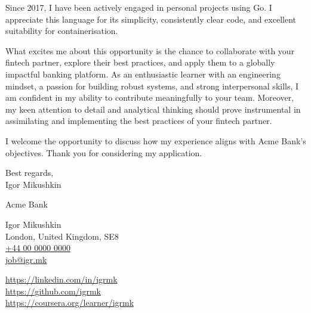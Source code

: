 \documentclass[9pt,a4paper]{juicv}
\makeatletter
\newcommand{\myphone}{\href{tel:+440000000000}{+44 00 0000 0000}}
\newcommand{\myemail}{\href{mailto:job@igr.mk}{job@igr.mk}}
\makeatother
\begin{document}
\begin{paracol}{2}
Since 2017, I have been actively engaged in personal projects using Go.
I appreciate this language for its simplicity, consistently clear code,
and excellent suitability for containerisation.

What excites me about this opportunity is the chance
to collaborate with your fintech partner, explore their best practices,
and apply them to a globally impactful banking platform.
As an enthusiastic learner with an engineering mindset,
a passion for building robust systems, and strong interpersonal skills,
I am confident in my ability to contribute meaningfully to your team.
Moreover, my keen attention to detail and analytical thinking should prove instrumental
in assimilating and implementing the best practices of your fintech partner.

I welcome the opportunity to discuss how my experience
aligns with Acme Bank's objectives.
Thank you for considering my application.

\vspace{12pt}

Best regards,\\
Igor Mikushkin

\newpage
\switchcolumn
\raggedright
\setlength{\parskip}{0em}

    Acme Bank

    Igor Mikushkin\\
    London, United Kingdom, SE8\\
    \myphone\\
    \myemail

    \vspace{6pt}
    {
        \small
        \href{https://linkedin.com/in/igrmk}{https://linkedin.com/in/igrmk}\\
        \href{https://github.com/igrmk}{https://github.com/igrmk}\\
        \href{https://coursera.org/learner/igrmk}{https://coursera.org/learner/igrmk}
        \par
    }

\end{paracol}
\end{document}
